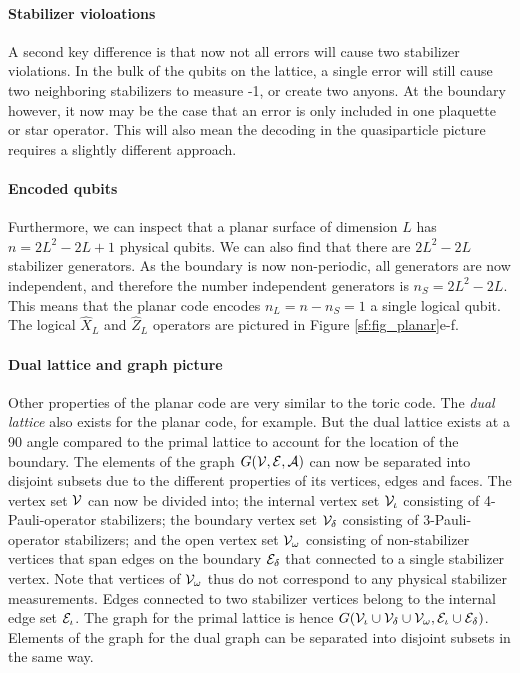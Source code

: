 \paragraph{Stabilizer violoations}
A second key difference is that now not all errors will cause two stabilizer violations. In the bulk of the qubits on the lattice, a single error will still cause two neighboring stabilizers to measure -1, or create two anyons. At the boundary however, it now may be the case that an error is only included in one plaquette or star operator. This will also mean the decoding in the quasiparticle picture requires a slightly different approach.

\paragraph{Encoded qubits}
Furthermore, we can inspect that a planar surface of dimension $L$ has $n = 2L^2-2L+1$ physical qubits. We can also find that there are $2L^2-2L$ stabilizer generators. As the boundary is now non-periodic, all generators are now independent, and therefore the number independent generators is $n_S = 2L^2-2L$. This means that the planar code encodes $n_L = n-n_S = 1$ a single logical qubit. The logical $\hat{X}_L$ and $\hat{Z}_L$ operators are pictured in Figure \ref{sf:fig_planar}e-f.

\paragraph{Dual lattice and graph picture}
Other properties of the planar code are very similar to the toric code. The \emph{dual lattice} also exists for the planar code, for example. But the dual lattice exists at a 90 angle compared to the primal lattice to account for the location of the boundary. The elements of the graph $G(\mathcal{V},\mathcal{E},\mathcal{A})$ can now be separated into disjoint subsets due to the different properties of its vertices, edges and faces. The vertex set $\mathcal{V}$ can now be divided into; the internal vertex set $\mathcal{V}_\iota$ consisting of 4-Pauli-operator stabilizers; the boundary vertex set $\mathcal{V}_{\delta}$ consisting of 3-Pauli-operator stabilizers; and the open vertex set $\mathcal{V}_\omega$ consisting of non-stabilizer vertices that span edges on the boundary $\mathcal{E}_{\delta}$ that connected to a single stabilizer vertex. Note that vertices of $\mathcal{V}_\omega$ thus do not correspond to any physical stabilizer measurements. Edges connected to two stabilizer vertices belong to the internal edge set $\mathcal{E}_\iota$. The graph for the primal lattice is hence $G(\mathcal{V}_\iota\cup \mathcal{V}_\delta \cup \mathcal{V}_\omega, \mathcal{E}_\iota\cup \mathcal{E}_\delta)$. Elements of the graph for the dual graph can be separated into disjoint subsets in the same way.

